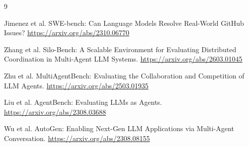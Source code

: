 \documentclass[10pt,twocolumn]{article}
\begin{document}
\begin{thebibliography}{9}

Jimenez et al. SWE-bench: Can Language Models Resolve Real-World GitHub Issues? \url{https://arxiv.org/abs/2310.06770}

Zhang et al. Silo-Bench: A Scalable Environment for Evaluating Distributed Coordination in Multi-Agent LLM Systems. \url{https://arxiv.org/abs/2603.01045}

Zhu et al. MultiAgentBench: Evaluating the Collaboration and Competition of LLM Agents. \url{https://arxiv.org/abs/2503.01935}

Liu et al. AgentBench: Evaluating LLMs as Agents. \url{https://arxiv.org/abs/2308.03688}

Wu et al. AutoGen: Enabling Next-Gen LLM Applications via Multi-Agent Conversation. \url{https://arxiv.org/abs/2308.08155}

\end{thebibliography}
\end{document}
